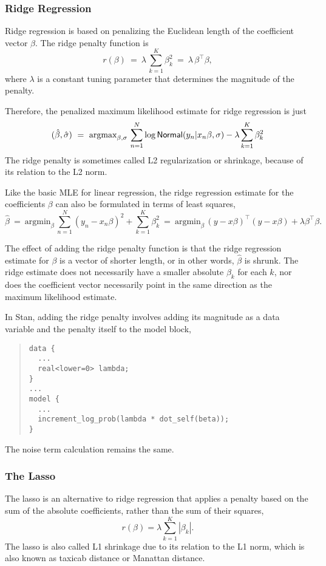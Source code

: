 \subsubsection{Ridge Regression}

Ridge regression \citep{HoerlKennard:1970} is based on penalizing the
Euclidean length of the coefficient vector $\beta$. The ridge penalty
function is
%
\[
r(\beta) 
\ = \
\lambda \, \sum_{k=1}^K \beta_k^2
\ = \ 
\lambda \, \beta^{\top} \beta,
\]
%
where $\lambda$ is a constant tuning parameter that determines the
magnitude of the penalty. 


Therefore, the penalized maximum likelihood estimate for ridge
regression is just
%
\[
(\hat{\beta},\hat{\sigma}) 
\ = \
\mbox{argmax}_{\beta,\sigma} \,
 \sum_{n=1}^N \log \distro{Normal}(y_n|x_n \beta, \sigma) - \lambda
 \sum_{k=1}^K \beta_k^2
\]
%
The ridge penalty is sometimes called L2 regularization or shrinkage,
because of its relation to the L2 norm.

Like the basic MLE for linear regression, the ridge regression
estimate for the coefficients $\beta$ can also be formulated in terms
of least squares,
%
\[
\hat{\beta}
\ = \ 
\mbox{argmin}_{\beta} \, \sum_{n=1}^N (y_n - x_n \beta)^2 + \sum_{k=1}^K \beta_k^2
\ = \ 
\mbox{argmin}_{\beta} \, (y - x\beta)^{\top} (y - x\beta) +
\lambda \beta^{\top} \beta.
\]

The effect of adding the ridge penalty function is that the ridge
regression estimate for $\beta$ is a vector of shorter length, or in
other words, $\hat{\beta}$ is shrunk.  The ridge estimate does not
necessarily have a smaller absolute $\beta_k$ for each $k$, nor does
the coefficient vector necessarily point in the same direction as the
maximum likelihood estimate.

In Stan, adding the ridge penalty involves adding its magnitude as a
data variable and the penalty itself to the model block,
%
\begin{quote}
\begin{Verbatim}
data {
  ...
  real<lower=0> lambda;
}
...
model {
  ...
  increment_log_prob(lambda * dot_self(beta));
}
\end{Verbatim}
\end{quote}
%
The noise term calculation remains the same.

\subsubsection{The Lasso}

The lasso \citep{Tibshirani:1996} is an alternative to ridge
regression that applies a penalty based on the sum of the absolute
coefficients, rather than the sum of their squares,
\[
r(\beta) = \lambda \sum_{k=1}^K | \beta_k |.
\]
The lasso is also called L1 shrinkage due to its relation to the L1
norm, which is also known as taxicab distance or Manattan distance.


